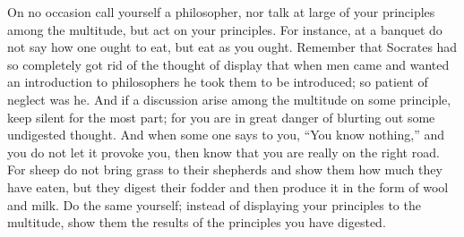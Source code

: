 On  no  occasion  call yourself  a  philosopher,  nor  talk  at large  of  your
principles among the multitude, but act  on your principles. For instance, at a
banquet do not  say how one ought to  eat, but eat as you  ought. Remember that
Socrates had so completely got rid of the thought of display that when men came
and wanted  an introduction to philosophers  he took them to  be introduced; so
patient of  neglect was he.  And if a discussion  arise among the  multitude on
some principle, keep silent  for the most part; for you are  in great danger of
blurting out some undigested thought. And when some one says to you, ``You know
nothing,'' and you do not let it provoke  you, then know that you are really on
the right road. For  sheep do not bring grass to their  shepherds and show them
how much they have  eaten, but they digest their fodder and  then produce it in
the form  of wool and  milk. Do the same  yourself; instead of  displaying your
principles to the  multitude, show them the results of  the principles you have
digested.
